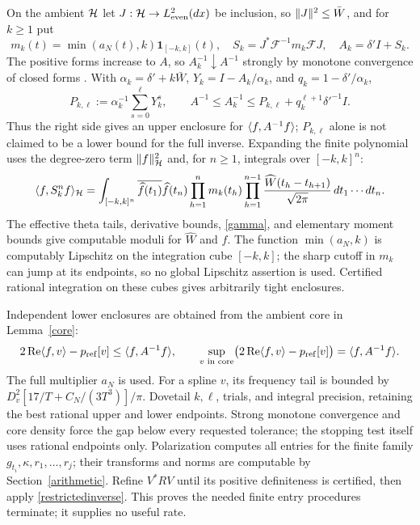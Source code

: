 \documentclass[11pt]{article}
\begin{document}
On the ambient $\mathcal H$ let $J:\mathcal H\to L^2_{\rm even}(dx)$ be inclusion, so $\lVert J\rVert^2\le\bar W$, and for $k\ge1$ put
\[m_k(t)=\min(a_N(t),k)\mathbf1_{[-k,k]}(t),\quad S_k=J^*\mathcal F^{-1}m_k\mathcal F J,\quad A_k=\delta'I+S_k.\]
The positive forms increase to $A$, so $A_k^{-1}\downarrow A^{-1}$ strongly by monotone convergence of closed forms \cite{reed}. With $\alpha_k=\delta'+k\bar W$, $Y_k=I-A_k/\alpha_k$, and $q_k=1-\delta'/\alpha_k$,
\begin{equation}\label{inverseupper}
 P_{k,\ell}:=\alpha_k^{-1}\sum_{s=0}^{\ell}Y_k^s,\qquad
 A^{-1}\le A_k^{-1}\le P_{k,\ell}+q_k^{\ell+1}\delta'^{-1}I.
\end{equation}
Thus the right side gives an upper enclosure for $\langle f,A^{-1}f\rangle$; $P_{k,\ell}$ alone is not claimed to be a lower bound for the full inverse. Expanding the finite polynomial uses the degree-zero term $\lVert f\rVert_{\mathcal H}^2$ and, for $n\ge1$, integrals over $[-k,k]^n$:
\begin{equation}\label{cubekernel}
 \langle f,S_k^n f\rangle_{\mathcal H}=\int_{[-k,k]^n}\overline{\widehat f(t_1)}\widehat f(t_n)
 \prod_{h=1}^{n}m_k(t_h)\prod_{h=1}^{n-1}\frac{\widehat W(t_h-t_{h+1})}{\sqrt{2\pi}}\,dt_1\cdots dt_n.
\end{equation}
The effective theta tails, derivative bounds, \eqref{gamma}, and elementary moment bounds give computable moduli for $\widehat W$ and $\widehat f$. The function $\min(a_N,k)$ is computably Lipschitz on the integration cube $[-k,k]$; the sharp cutoff in $m_k$ can jump at its endpoints, so no global Lipschitz assertion is used. Certified rational integration on these cubes gives arbitrarily tight enclosures.

Independent lower enclosures are obtained from the ambient core in Lemma~\ref{core}:
\begin{equation}\label{inverselower}
 2\operatorname{Re}\langle f,v\rangle-p_{\rm ref}[v]\le\langle f,A^{-1}f\rangle,
 \qquad \sup_{v\text{ in core}}\bigl(2\operatorname{Re}\langle f,v\rangle-p_{\rm ref}[v]\bigr)=\langle f,A^{-1}f\rangle.
\end{equation}
The full multiplier $a_N$ is used. For a spline $v$, its frequency tail is bounded by $D_v^2[17/T+C_N/(3T^3)]/\pi$. Dovetail $k,\ell$, trials, and integral precision, retaining the best rational upper and lower endpoints. Strong monotone convergence and core density force the gap below every requested tolerance; the stopping test itself uses rational endpoints only. Polarization computes all entries for the finite family $g_{t_i},\kappa,r_1,\ldots,r_j$; their transforms and norms are computable by Section~\ref{arithmetic}. Refine $V^*RV$ until its positive definiteness is certified, then apply \eqref{restrictedinverse}. This proves the needed finite entry procedures terminate; it supplies no useful rate.
\end{document}
